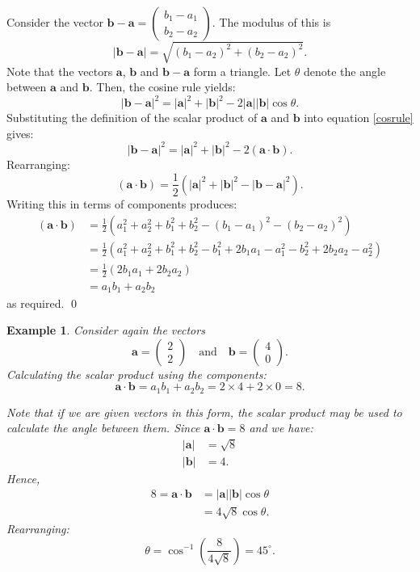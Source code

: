 \documentclass[12pt,a4paper]{article}
\theoremstyle{clearprint}
\renewenvironment{proof}[1][\proofname]
{\noindent{\bf {#1}.}\hspace*{1em}}%
{\qed\par}%
\newtheorem{example}[proposition]{Example}
\newcommand{\bvec}[1]{\mathrm{\mathbf{#1}}}
\newcommand{\cvec}[2]{\begin{pmatrix} #1 \\ #2 \end{pmatrix}}
\newcommand{\vmod}[1]{\lvert #1 \rvert}
\begin{document}
\begin{proof}
Consider the vector \(\bvec{b} - \bvec{a} = \cvec{b_1 - a_1}{b_2 - a_2}\). The modulus of this is
\[
\vmod{\bvec{b} - \bvec{a}} = \sqrt{(b_1 - a_2)^2 + (b_2 - a_2)^2}.
\] 
Note that the vectors \(\bvec{a}\), \(\bvec{b}\) and \(\bvec{b}-\bvec{a}\) form a triangle. Let \(\theta\) denote the angle between \(\bvec{a}\) and \(\bvec{b}\). Then, the cosine rule yields:
\begin{equation}
\label{cosrule}
{\vmod{\bvec{b}-\bvec{a}}}^2 = {\vmod{\bvec{a}}}^2 + {\vmod{\bvec{b}}}^2 - 2\vmod{\bvec{a}}\vmod{\bvec{b}}\cos\theta. 
\end{equation} 
Substituting the definition of the scalar product of \(\bvec{a}\) and \(\bvec{b}\) into equation \ref{cosrule} gives:
\[
{\vmod{\bvec{b}-\bvec{a}}}^2 = {\vmod{\bvec{a}}}^2 + {\vmod{\bvec{b}}}^2 - 2\left(\bvec{a}\cdot \bvec{b}\right).
\] 
Rearranging:
\[
\left(\bvec{a}\cdot \bvec{b}\right) = \frac{1}{2}\left({\vmod{\bvec{a}}}^2 + {\vmod{\bvec{b}}}^2 - {\vmod{\bvec{b}-\bvec{a}}}^2\right).
\]
Writing this in terms of components produces:
\begin{align*}
\left(\bvec{a}\cdot \bvec{b}\right) &= \frac{1}{2}\left(a_1^2 + a_2^2 + b_1^2 + b_2^2 - (b_1 - a_1)^2 - (b_2 - a_2)^2\right)\\
&=\frac{1}{2}\left(a_1^2 + a_2^2 + b_1^2 + b_2^2 - b_1^2 + 2b_1a_1 - a_1^2 - b_2^2 + 2b_2a_2 - a_2^2\right)\\
&=\frac{1}{2}\left(2b_1a_1 + 2b_2a_2\right)\\
&=a_1b_1 + a_2b_2
\end{align*}
as required. 
\end{proof}

\begin{example}
Consider again the vectors
\[
\bvec{a} = \cvec{2}{2} \quad \text{and} \quad \bvec{b} = \cvec{4}{0}.
\]
Calculating the scalar product using the components:
\[
\bvec{a} \cdot \bvec{b} = a_1b_1 + a_2b_2 = 2\times 4 + 2\times 0 = 8. 
\]

Note that if we are given vectors in this form, the scalar product may be used to calculate the angle between them. Since \(\bvec{a} \cdot \bvec{b} = 8\) and we have:
\begin{align*}
\vmod{\bvec{a}} &= \sqrt{8}\\
\vmod{\bvec{b}} &= 4.
\end{align*}
Hence,
\begin{align*}
8 = \bvec{a} \cdot \bvec{b} &= \vmod{\bvec{a}}\vmod{\bvec{b}}\cos\theta\\
&= 4\sqrt{8}\cos \theta.
\end{align*}
Rearranging:
\[
\theta = \cos^{-1}\left(\frac{8}{4\sqrt{8}}\right) = {45}^{\circ}.
\]
\end{example}
\end{document}
